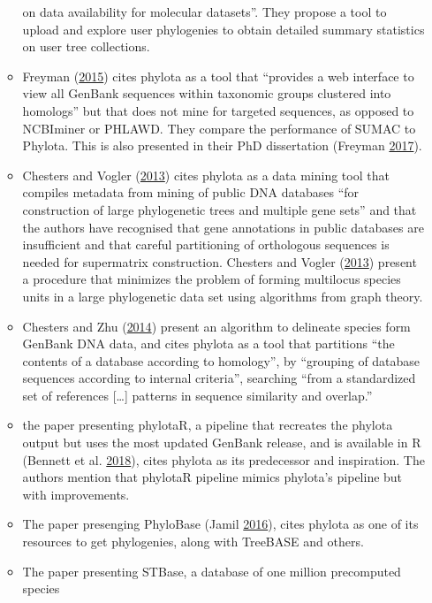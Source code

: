 \documentclass[]{article}
\begin{document}
\begin{enumerate}
\begin{itemize}
    on data availability for molecular datasets''. They propose a tool to upload and
    explore user phylogenies to obtain detailed summary statistics on user tree collections.
  \item
    Freyman (\protect\hyperlink{ref-freyman2015sumac}{2015}) cites phylota as a tool that ``provides a web interface to view
    all GenBank sequences within taxonomic groups clustered into homologs'' but that
    does not mine for targeted sequences, as opposed to NCBIminer or PHLAWD. They
    compare the performance of SUMAC to Phylota. This is also presented in their PhD dissertation (Freyman \protect\hyperlink{ref-freyman2017phylogenetic}{2017}).
  \item
    Chesters and Vogler (\protect\hyperlink{ref-chesters2013resolving}{2013}) cites phylota as a data mining tool that compiles metadata
    from mining of public DNA databases ``for construction of large phylogenetic trees
    and multiple gene sets'' and that the authors have recognised that gene annotations
    in public databases are insufficient and that careful partitioning of orthologous
    sequences is needed for supermatrix construction. Chesters and Vogler (\protect\hyperlink{ref-chesters2013resolving}{2013}) present
    a procedure that minimizes the problem of forming multilocus species units in
    a large phylogenetic data set using algorithms from graph theory.
  \item
    Chesters and Zhu (\protect\hyperlink{ref-chesters2014protocol}{2014}) present an algorithm to delineate species form GenBank
    DNA data, and cites phylota as a tool that partitions ``the contents of a database
    according to homology'', by ``grouping of database sequences according to internal
    criteria'', searching ``from a standardized set of references {[}\ldots{}{]} patterns in
    sequence similarity and overlap.''
  \item
    the paper presenting phylotaR, a pipeline that recreates the phylota output
    but uses the most updated GenBank release, and is available in R (Bennett et al. \protect\hyperlink{ref-bennett2018phylotar}{2018}),
    cites phylota as its predecessor and inspiration. The authors mention that phylotaR
    pipeline mimics phylota's pipeline but with improvements.
  \item
    The paper presenging PhyloBase (Jamil \protect\hyperlink{ref-jamil2016visual}{2016}), cites phylota as one of
    its resources to get phylogenies, along with TreeBASE and others.
  \item
    The paper presenting STBase, a database of one million precomputed species

\end{itemize}
\end{enumerate}
\end{document}
